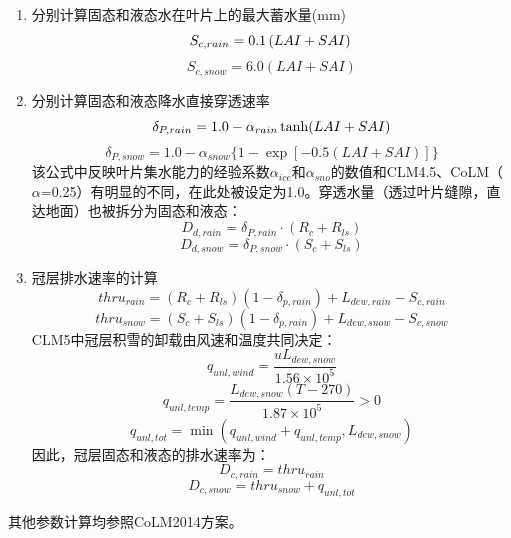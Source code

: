 \begin{enumerate}
\item 分别计算固态和液态水在叶片上的最大蓄水量(mm)\\
\begin{equation}
S_{c,rain}=0.1\left(LAI+SAI\right)\\
\end{equation}
\begin{equation}
S_{c,snow}=6.0\left(LAI+SAI\right)
\end{equation}
\item 分别计算固态和液态降水直接穿透速率\\
\begin{equation}
\delta_{P,rain}=1.0- \alpha_{rain}  \tanh (LAI+SAI)  \\
\end{equation}
\begin{equation}
\delta_{P,snow}=1.0- \alpha_{snow}\{1-\exp [-0.5(LAI+SAI)]\}
\end{equation}
该公式中反映叶片集水能力的经验系数$\alpha_{ice}$和$\alpha_{sno}$的数值和CLM4.5、CoLM（$\alpha$=0.25）有明显的不同，在此处被设定为1.0。穿透水量（透过叶片缝隙，直达地面）也被拆分为固态和液态：
\begin{equation}
D_{d,rain}=\delta_{P,rain} \cdot\left(R_{c}+R_{ls}\right)
\end{equation}
\begin{equation}
D_{d,snow}=\delta_{P,snow} \cdot\left(S_{c}+S_{ls}\right)
\end{equation}
\item 冠层排水速率的计算
\begin{equation}
thru_{rain}=\left(R_{c}+R_{ls}\right)\left(1-\delta_{p,rain}\right)+L_{dew,rain}-S_{c,rain}
\end{equation}
\begin{equation}
thru_{snow}=\left(S_{c}+S_{ls}\right)\left(1-\delta_{p,rain}\right)+L_{dew,snow}-S_{c,snow}
\end{equation}
CLM5中冠层积雪的卸载由风速和温度共同决定：
\begin{equation}
q_{unl, wind}=\frac{u L_{dew, snow}}{1.56 \times 10^{5}}
\end{equation}
\begin{equation}
q_{unl, temp}=\frac{L_{dew, snow}(T-270)}{1.87 \times 10^{5}}>0
\end{equation}
\begin{equation}
q_{unl, tot}=\min \left(q_{unl, wind}+q_{unl, temp}, L_{dew, snow}\right)
\end{equation}
因此，冠层固态和液态的排水速率为：
\begin{equation}
D_{c,rain}=thru_{rain}
\end{equation}
\begin{equation}
D_{c,snow}=thru_{snow}+q_{unl, tot}
\end{equation}
\end{enumerate}
其他参数计算均参照CoLM2014方案。
